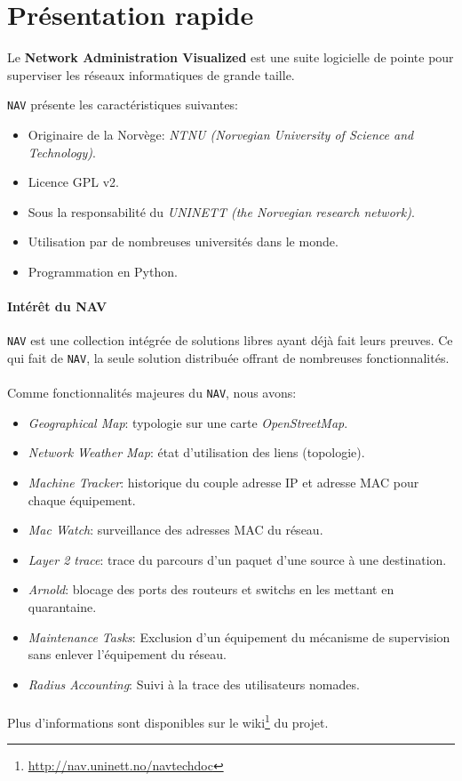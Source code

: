 \section{Présentation rapide}
Le \textbf{Network Administration Visualized} est une suite logicielle de pointe pour superviser les réseaux informatiques de grande taille.

\texttt{NAV} présente les caractéristiques suivantes:

\begin{itemize}
\item Originaire de la Norvège: \emph{NTNU (Norvegian University of Science and Technology)}.
\item Licence GPL v2. 
\item Sous la responsabilité du \emph{UNINETT (the Norvegian research network)}. 
\item Utilisation par de nombreuses universités dans le monde. 
\item Programmation en Python.
\end{itemize}

\paragraph{Intérêt du NAV\\}
\texttt{NAV} est une collection intégrée de solutions libres ayant déjà fait leurs preuves. Ce qui fait de \texttt{NAV}, la seule solution distribuée offrant de nombreuses fonctionnalités.


\paragraph{}
Comme fonctionnalités majeures du \texttt{NAV}, nous avons:
\begin{itemize}
\item \emph{Geographical Map}: typologie sur une carte \emph{OpenStreetMap}.
\item \emph{Network Weather Map}: état d'utilisation des liens (topologie).
\item \emph{Machine Tracker}: historique du couple adresse IP et adresse MAC pour chaque équipement.
\item \emph{Mac Watch}: surveillance des adresses MAC du réseau. 
\item \emph{Layer 2 trace}: trace du parcours d'un paquet d'une source à une destination.
\item \emph{Arnold}: blocage des ports des routeurs et switchs en les mettant en quarantaine.
\item \emph{Maintenance Tasks}: Exclusion d'un équipement du mécanisme de supervision sans enlever l'équipement du réseau.
\item \emph{Radius Accounting}: Suivi à la trace des utilisateurs nomades.
\end{itemize} 



\paragraph{}
Plus d'informations sont disponibles sur le wiki\footnote{\url{http://nav.uninett.no/navtechdoc}} du projet.